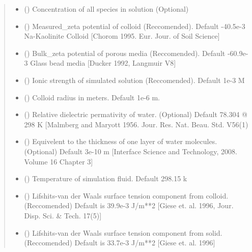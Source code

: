 \documentclass[letterpaper,10pt,english]{sphinxmanual}
\begin{document}
\begin{fulllineitems}
\begin{quote}
\begin{description}
\begin{itemize}
\item {} 
 () \textendash{} Concentration of all species in solution (Optional)

\item {} 
 () \textendash{} Measured\_zeta potential of colloid (Reccomended).
Default -40.5e-3 Na-Kaolinite Colloid {[}Chorom 1995. Eur. Jour. of Soil Science{]}

\item {} 
 () \textendash{} Bulk\_zeta potential of porous media (Reccomended).
Default -60.9e-3 Glass bead media {[}Ducker 1992, Langmuir V8{]}

\item {} 
 () \textendash{} Ionic strength of simulated solution (Reccomended). Default 1e-3 M

\item {} 
 () \textendash{} Colloid radius in meters. Default 1e-6 m.

\item {} 
 () \textendash{} Relative dielectric permativity of water. (Optional)
Default 78.304 @ 298 K {[}Malmberg and Maryott 1956. Jour. Res. Nat. Beau. Std. V56(1)

\item {} 
 () \textendash{} Equivelent to the thickness of one layer of water molecules. (Optional)
Default 3e-10 m {[}Interface Science and Technology, 2008. Volume 16 Chapter 3{]}

\item {} 
 () \textendash{} Temperature of simulation fluid. Default 298.15 k

\item {} 
 () \textendash{} Lifshits-van der Waals surface tension component from colloid. (Reccomended)
Default is 39.9e-3 J/m**2 {[}Giese et. al. 1996, Jour. Disp. Sci. \& Tech. 17(5){]}

\item {} 
 () \textendash{} Lifshits-van der Waals surface tension component from solid. (Reccomended)
Default is 33.7e-3 J/m**2 {[}Giese et. al. 1996{]}


\end{itemize}
\end{description}
\end{quote}
\end{fulllineitems}
\end{document}
